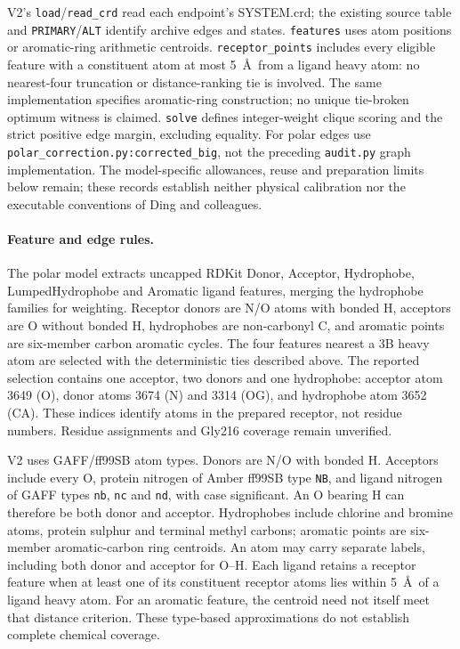 \documentclass{article}
\begin{document}
V2's \texttt{load}/\texttt{read\_crd} read each endpoint's SYSTEM.crd; the existing source table and \texttt{PRIMARY}/\texttt{ALT} identify archive edges and states. \texttt{features} uses atom positions or aromatic-ring arithmetic centroids. \texttt{receptor\_points} includes every eligible feature with a constituent atom at most 5~\AA\ from a ligand heavy atom: no nearest-four truncation or distance-ranking tie is involved. The same implementation specifies aromatic-ring construction; no unique tie-broken optimum witness is claimed. \texttt{solve} defines integer-weight clique scoring and the strict positive edge margin, excluding equality. For polar edges use \texttt{polar\_correction.py:corrected\_big}, not the preceding \texttt{audit.py} graph implementation. The model-specific allowances, reuse and preparation limits below remain; these records establish neither physical calibration nor the executable conventions of Ding and colleagues.

\paragraph{Feature and edge rules.}
The polar model extracts uncapped RDKit Donor, Acceptor, Hydrophobe, LumpedHydrophobe and Aromatic ligand features, merging the hydrophobe families for weighting. Receptor donors are N/O atoms with bonded H, acceptors are O without bonded H, hydrophobes are non-carbonyl C, and aromatic points are six-member carbon aromatic cycles. The four features nearest a 3B heavy atom are selected with the deterministic ties described above. The reported selection contains one acceptor, two donors and one hydrophobe: acceptor atom 3649 (O), donor atoms 3674 (N) and 3314 (OG), and hydrophobe atom 3652 (CA). These indices identify atoms in the prepared receptor, not residue numbers. Residue assignments and Gly216 coverage remain unverified.

V2 uses GAFF/ff99SB atom types. Donors are N/O with bonded H. Acceptors include every O, protein nitrogen of Amber ff99SB type \texttt{NB}, and ligand nitrogen of GAFF types \texttt{nb}, \texttt{nc} and \texttt{nd}, with case significant. An O bearing H can therefore be both donor and acceptor. Hydrophobes include chlorine and bromine atoms, protein sulphur and terminal methyl carbons; aromatic points are six-member aromatic-carbon ring centroids. An atom may carry separate labels, including both donor and acceptor for O--H. Each ligand retains a receptor feature when at least one of its constituent receptor atoms lies within 5~\AA\ of a ligand heavy atom. For an aromatic feature, the centroid need not itself meet that distance criterion. These type-based approximations do not establish complete chemical coverage.
\end{document}

